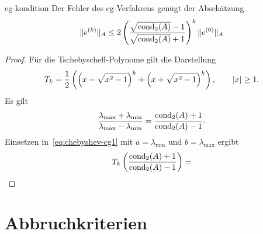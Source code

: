 \begin{Satz}{cg-kondition}
  Der Fehler des cg-Verfahrens genügt der Abschätzung
  \begin{gather}
    \lVert e^{(k)}\rVert_A \le 2 \left(
      \frac{\sqrt{\operatorname{cond}_2(A)}-1}{\sqrt{\operatorname{cond}_2(A)}+1}\right)^k
    \lVert e^{(0)}\rVert_A
  \end{gather}
\end{Satz}

\begin{proof}
  Für die Tschebyscheff-Polynome gilt die Darstellung
  \begin{gather}
    T_k = \frac12
    \left(
      \left(x-\sqrt{x^2-1}\right)^k
      +
      \left(x+\sqrt{x^2-1}\right)^k
    \right),\qquad\lvert x\rvert\ge 1.
  \end{gather}
  Es gilt
  \begin{gather}
    \frac{\lambda_{\max}+\lambda_{\min}}{\lambda_{\max}-\lambda_{\min}}
    = \frac{\operatorname{cond}_2(A)+1}{\operatorname{cond}_2(A)-1}.
  \end{gather}
  Einsetzen in~\eqref{eq:chebyshev-cg1} mit $a=\lambda_{\min}$ und $b=\lambda_{\max}$ ergibt
  \begin{gather}
    T_k\left(\frac{\operatorname{cond}_2(A)+1}{\operatorname{cond}_2(A)-1}\right)
    = 
  \end{gather}
\end{proof}

\section{Abbruchkriterien}

